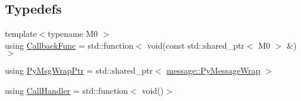 \subsection*{Typedefs}
\begin{DoxyCompactItemize}
\item 
{\footnotesize template$<$typename M0 $>$ }\\using \hyperlink{namespaceapollo_1_1cyber_ac2b119de9ef52dbfcee3b6e8d497adc4}{Callback\-Func} = std\-::function$<$ void(const std\-::shared\-\_\-ptr$<$ M0 $>$ \&)$>$
\item 
using \hyperlink{namespaceapollo_1_1cyber_a1152fb39339af5618cb8e3a7afc89703}{Py\-Msg\-Wrap\-Ptr} = std\-::shared\-\_\-ptr$<$ \hyperlink{classapollo_1_1cyber_1_1message_1_1PyMessageWrap}{message\-::\-Py\-Message\-Wrap} $>$
\item 
using \hyperlink{namespaceapollo_1_1cyber_a73f7b365c4d923725c0a03bfb8c97978}{Call\-Handler} = std\-::function$<$ void()$>$
\end{DoxyCompactItemize}
